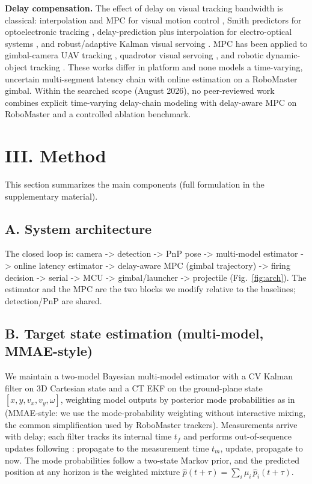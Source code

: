 \documentclass[journal]{IEEEtran}
\begin{document}
\textbf{Delay compensation.} The effect of delay on visual tracking bandwidth is classical: interpolation and MPC for visual motion control \cite{ref5}, Smith predictors for optoelectronic tracking \cite{ref6}, delay-prediction plus interpolation for electro-optical systems \cite{ref7}\cite{ref8}, and robust/adaptive Kalman visual servoing \cite{ref9}\cite{ref10}. MPC has been applied to gimbal-camera UAV tracking \cite{ref11}, quadrotor visual servoing \cite{ref14}, and robotic dynamic-object tracking \cite{ref15}. These works differ in platform and none models a time-varying, uncertain multi-segment latency chain with online estimation on a RoboMaster gimbal. Within the searched scope (August 2026), no peer-reviewed work combines explicit time-varying delay-chain modeling with delay-aware MPC on RoboMaster and a controlled ablation benchmark.
\section*{III. Method}

This section summarizes the main components (full formulation in the supplementary material).

\subsection*{A. System architecture}

The closed loop is: camera -> detection -> PnP pose -> multi-model estimator -> online latency estimator -> delay-aware MPC (gimbal trajectory) -> firing decision -> serial -> MCU -> gimbal/launcher -> projectile (Fig.~\ref{fig:arch}). The estimator and the MPC are the two blocks we modify relative to the baselines; detection/PnP are shared.

\subsection*{B. Target state estimation (multi-model, MMAE-style)}

We maintain a two-model Bayesian multi-model estimator with a CV Kalman filter on 3D Cartesian state and a CT EKF on the ground-plane state $[x,y,v_x,v_y,\omega]$, weighting model outputs by posterior mode probabilities as in \cite{ref16} (MMAE-style: we use the mode-probability weighting without interactive mixing, the common simplification used by RoboMaster trackers). Measurements arrive with delay; each filter tracks its internal time $t_f$ and performs out-of-sequence updates following \cite{ref17}: propagate to the measurement time $t_m$, update, propagate to now. The mode probabilities follow a two-state Markov prior, and the predicted position at any horizon is the weighted mixture $\hat p(t+\tau)=\sum_i \mu_i\,\hat p_i(t+\tau)$.
\end{document}
